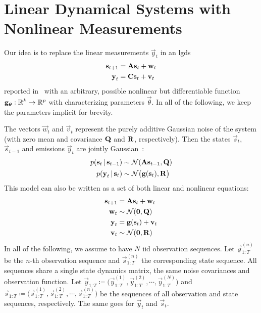 \section{Linear Dynamical Systems with Nonlinear Measurements}

Our idea is to replace the linear measurements \( \vec{y}_t \) in an \ac{lgds}
\begin{align*}
	\boldsymbol{\mathrm{s}}_{t + 1} & = \boldsymbol{\mathrm{A}} \boldsymbol{\mathrm{s}}_t + \boldsymbol{\mathrm{w}}_t \\
	\boldsymbol{\mathrm{y}}_t       & = \boldsymbol{\mathrm{C}} \boldsymbol{\mathrm{s}}_t + \boldsymbol{\mathrm{v}}_t
\end{align*}
reported in~\cite{ghahramaniParameterEstimationLinear1996} with an arbitrary, possible nonlinear but differentiable function \( \boldsymbol{\mathrm{g}}_{\boldsymbol{\mathrm{\theta}}} : \mathbb{R}^k \to \mathbb{R}^p \) with characterizing parameters \( \vec{\theta} \). In all of the following, we keep the parameters implicit for brevity.

The vectors \( \vec{w}_t \) and \( \vec{v}_t \) represent the purely additive Gaussian noise of the system (with zero mean and covariance \( \boldsymbol{\mathrm{Q}} \) and \( \boldsymbol{\mathrm{R}} \), respectively). Then the states \( \vec{s}_t \), \( \vec{s}_{t - 1} \) and emissions \( \vec{y}_t \) are jointly Gaussian~\cite{minkaHiddenMarkovModels1999}:
\begin{align*}
	p(\boldsymbol{\mathrm{s}}_t \,\vert\, \boldsymbol{\mathrm{s}}_{t - 1}) & \sim \mathcal{N}(\boldsymbol{\mathrm{A}} \boldsymbol{\mathrm{s}}_{t - 1}, \boldsymbol{\mathrm{Q}})    \\
	p(\boldsymbol{\mathrm{y}}_t \,\vert\, \boldsymbol{\mathrm{s}}_t)       & \sim \mathcal{N}\big(\boldsymbol{\mathrm{g}}(\boldsymbol{\mathrm{s}}_t), \boldsymbol{\mathrm{R}}\big)
\end{align*}
This model can also be written as a set of both linear and nonlinear equations:
\begin{align*}
	\boldsymbol{\mathrm{s}}_{t + 1} & = \boldsymbol{\mathrm{A}} \boldsymbol{\mathrm{s}}_t + \boldsymbol{\mathrm{w}}_t  \\
	\boldsymbol{\mathrm{w}}_t       & \sim \mathcal{N}(\boldsymbol{\mathrm{0}}, \boldsymbol{\mathrm{Q}})   \\
	\boldsymbol{\mathrm{y}}_t       & = \boldsymbol{\mathrm{g}}(\boldsymbol{\mathrm{s}}_t) + \boldsymbol{\mathrm{v}}_t \\
	\boldsymbol{\mathrm{v}}_t       & \sim \mathcal{N}(\boldsymbol{\mathrm{0}}, \boldsymbol{\mathrm{R}})
\end{align*}
In all of the following, we assume to have \(N\) \ac{iid} observation sequences. Let \( \vec{y}_{1:T}^{(n)} \) be the \(n\)-th observation sequence and \( \vec{s}_{1:T}^{(n)} \) the corresponding state sequence. All sequences share a single state dynamics matrix, the same noise covariances and observation function. Let \( \vec{y}_{1:T} \coloneqq \big(\vec{y}_{1:T}^{(1)}, \vec{y}_{1:T}^{(2)}, \cdots, \vec{y}_{1:T}^{(N)}\big) \) and \( \vec{s}_{1:T} \coloneqq \big(\vec{s}_{1:T}^{(1)}, \vec{s}_{1:T}^{(2)}, \cdots, \vec{s}_{1:T}^{(n)}\big) \) be the sequences of all observation and state sequences, respectively. The same goes for \( \vec{y}_t \) and \( \vec{s}_t \).


